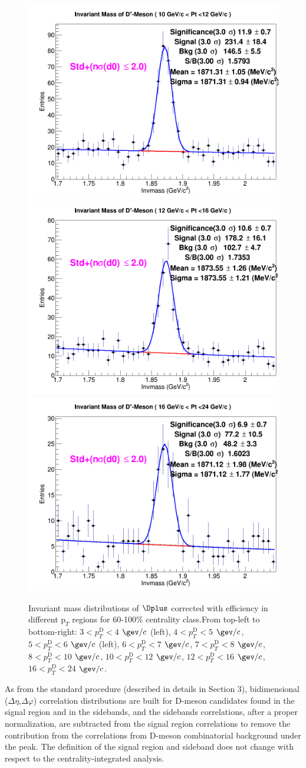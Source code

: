 \begin{figure}[!htp]
{\includegraphics[width=0.3\linewidth]{Centrality_DPlus/Dplus/Cmp_Prompt/ZNA/60_100/DplusMassPlots/1Dhist_DplusMass_12OCT16_pT_bin9.png}}
{\includegraphics[width=0.3\linewidth]{Centrality_DPlus/Dplus/Cmp_Prompt/ZNA/60_100/DplusMassPlots/1Dhist_DplusMass_12OCT16_pT_bin10.png}}
{\includegraphics[width=0.3\linewidth]{Centrality_DPlus/Dplus/Cmp_Prompt/ZNA/60_100/DplusMassPlots/1Dhist_DplusMass_12OCT16_pT_bin11.png}}
\caption{Invariant mass distributions of $\Dplus$ corrected with efficiency in different $\text{p}_T$ regions for 60-100$\%$ centrality class.From top-left to bottom-right: $3< p_{T}^{\text{D}}< 4$ $\gev/c$ (left), $4< p_{T}^{\text{D}}< 5$ $\gev/c$, $5< p_{T}^{\text{D}}< 6$ $\gev/c$ (left), $6 < p_{T}^{\text{D}} < 7$ $\gev/c$, $7< p_{T}^{\text{D}}< 8$ $\gev/c$, $8< p_{T}^{\text{D}}< 10$ $\gev/c$, $10< p_{T}^{\text{D}}< 12$ $\gev/c$, $12 < p_{T}^{\text{D}}< 16$ $\gev/c$, $16<p_{T}^{\text{D}}< 24$ $\gev/c$.}
\label{fig:InvMassDplus60100}
\end{figure}

As from the standard procedure (described in details in Section 3), bidimensional ($\Delta\eta$,$\Delta\varphi$) correlation distributions are built for D-meson candidates found in the signal region and in the sidebands, and the sidebands correlations, after a proper normalization, are subtracted from the signal region correlations to remove the contribution from the correlations from D-meson combinatorial background under the peak. The definition of the signal region and sideband does not change with respect to the centrality-integrated analysis.

